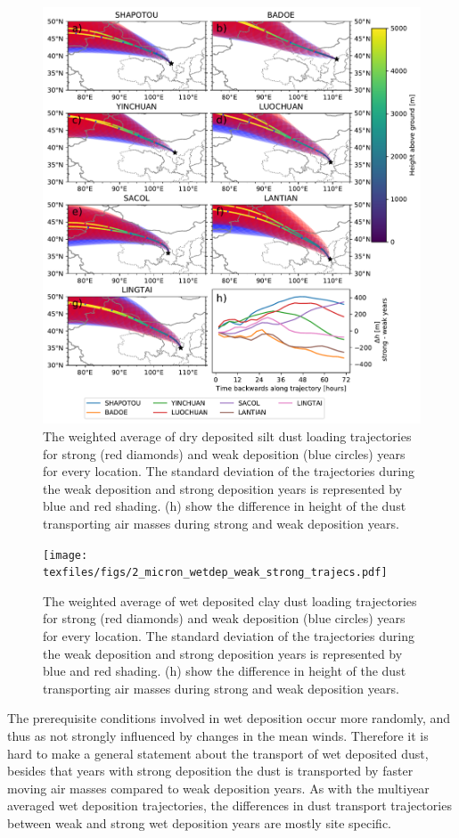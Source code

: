 \begin{figure}[htbp]
    \centering
    \includegraphics[width=\textwidth]{texfiles/figs/20_micron_drydep_weak_strong_trajecs.pdf}
    \caption{The weighted average of dry deposited silt dust loading trajectories for strong (red diamonds) and weak deposition (blue circles) years for every location. The standard deviation of the trajectories during the weak deposition and strong deposition years is represented by blue and red shading. (h) show the difference in height of the dust transporting air masses during strong and weak deposition years. }
    \label{fig:strong_weak_drydepo_year_20mmu_trajecs}
\end{figure}


\begin{figure}[htbp]
    \centering
    \texttt{[image: texfiles/figs/2\_micron\_wetdep\_weak\_strong\_trajecs.pdf]}
    \caption{The weighted average of wet deposited clay dust loading trajectories for strong (red diamonds) and weak deposition (blue circles) years for every location. The standard deviation of the trajectories during the weak deposition and strong deposition years is represented by blue and red shading.  (h) show the difference in height of the dust transporting air masses during strong and weak deposition years. }
    \label{fig:strong_weak_wetdepo_year_2mmu_trajecs}
\end{figure}
The prerequisite conditions involved in wet deposition occur more randomly, and thus as not strongly influenced by changes in the mean winds. 
Therefore it is hard to make a general statement about the transport of wet deposited dust, besides that years with strong deposition the dust is transported by faster moving air masses compared to weak deposition years. 
As with the multiyear averaged wet deposition trajectories, the differences in dust transport trajectories between weak and strong wet deposition years are mostly site specific. 

